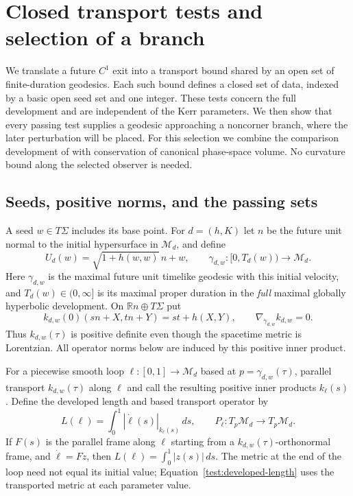 \section{Closed transport tests and selection of a branch}
\label{test:section}

We translate a future $C^1$ exit into a transport bound shared by an
open set of finite-duration geodesics. Each such bound defines a closed
set of data, indexed by a basic open seed set and one integer. These
tests concern the full development and are independent of the Kerr
parameters. We then show that every passing test supplies a geodesic
approaching a noncorner branch, where the later perturbation will be
placed. For this selection we combine the comparison development of
\cite[]{Foundation} with
conservation of canonical phase-space volume. No curvature bound along
the selected observer is needed.

\subsection{Seeds, positive norms, and the passing sets}

A seed $w\in T\Sigma$ includes its base point. For $d=(h,K)$ let
$n$ be the future unit normal to the initial hypersurface in
$\mathcal M_d$, and define
\begin{equation}\label{test:seed}
 U_d(w)=\sqrt{1+h(w,w)}\,n+w,
 \qquad
 \gamma_{d,w}:[0,T_d(w))\longrightarrow\mathcal M_d .
\end{equation}
Here $\gamma_{d,w}$ is the maximal future unit timelike geodesic with
this initial velocity, and $T_d(w)\in(0,\infty]$ is its maximal
proper duration in the \emph{full} maximal globally hyperbolic
development. On $\mathbb R n\oplus T\Sigma$ put
\begin{equation}\label{test:positive-metric}
 k_{d,w}(0)(sn+X,tn+Y)=st+h(X,Y),
 \qquad \nabla_{\dot\gamma_{d,w}}k_{d,w}=0.
\end{equation}
Thus $k_{d,w}(\tau)$ is positive definite even though the spacetime
metric is Lorentzian. All operator norms below are induced by this
positive inner product.

For a piecewise smooth loop $\ell:[0,1]\to\mathcal M_d$ based at
$p=\gamma_{d,w}(\tau)$, parallel transport $k_{d,w}(\tau)$ along
$\ell$ and call the resulting positive inner products $k_\ell(s)$.
Define the developed length and based transport operator by
\begin{equation}\label{test:developed-length}
 L(\ell)=\int_0^1|\dot\ell(s)|_{k_\ell(s)}\,ds,
 \qquad P_\ell:T_p\mathcal M_d\longrightarrow T_p\mathcal M_d.
\end{equation}
If $F(s)$ is the parallel frame along $\ell$ starting from a
$k_{d,w}(\tau)$-orthonormal frame, and $\dot\ell=Fz$, then
$L(\ell)=\int_0^1|z(s)|\,ds$. The metric at the end of the
loop need not equal its initial value; Equation~\eqref{test:developed-length}
uses the transported metric at each parameter value.

